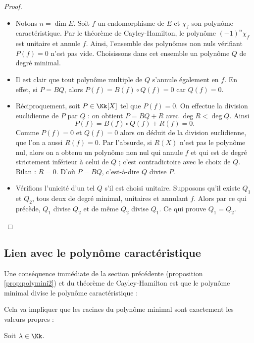 \documentclass[12pt, class=report,crop=false]{standalone}
\begin{document}
\begin{proof}~
\begin{itemize}
  \item Notons $n=\dim E$. Soit $f$ un endomorphisme de $E$ et $\chi_f$ son polynôme caractéristique. Par le théorème de Cayley-Hamilton, le polynôme $(-1)^n\chi_f$ est unitaire et annule $f$.
Ainsi, l'ensemble des polynômes non nuls vérifiant $P(f)=0$ n'est pas vide. Choisissons dans cet ensemble un polynôme $Q$ de degré minimal. 

  \item Il est clair que tout polynôme multiple de $Q$ s'annule également en $f$. En effet, si $P=BQ$, alors $P(f)=B(f)\circ Q(f)=0$ car $Q(f) = 0$.
 
 
  \item Réciproquement, soit $P\in \Kk[X]$ tel que $P(f)=0$. On effectue la division euclidienne de $P$ par $Q$ : on obtient $P=BQ+R$ avec $\deg R<\deg Q$. Ainsi 
$$P(f)=B(f)\circ Q(f)+R(f)=0.$$
Comme $P(f)=0$ et $Q(f)=0$ alors on déduit de la division euclidienne, que l'on a aussi $R(f)=0$. 
Par l'absurde, si $R(X)$ n'est pas le polynôme nul, alors on a obtenu un polynôme non nul qui annule $f$ et qui est de degré strictement inférieur à celui de $Q$ ; c'est contradictoire avec le choix de $Q$. Bilan : $R=0$. D'où $P=BQ$, c'est-à-dire $Q$ divise $P$.

   \item Vérifions l'unicité d'un tel $Q$ s'il est choisi unitaire.
   Supposons qu'il existe $Q_1$ et $Q_2$, tous deux de degré minimal, unitaires et annulant $f$. Alors par ce qui précède, $Q_1$ divise $Q_2$ et de même $Q_2$ divise $Q_1$. Ce qui prouve $Q_1=Q_2$.
\end{itemize}
\end{proof}





\subsection{Lien avec le polynôme caractéristique}

Une conséquence immédiate de la section précédente (proposition \ref{prop:polymini2}) et du théorème de Cayley-Hamilton est que le polynôme minimal divise le polynôme caractéristique :


Cela va impliquer que les racines du polynôme minimal sont exactement les valeurs propres :
\begin{proposition}
Soit $\lambda \in \Kk$.
\end{proposition} 
\end{document}
